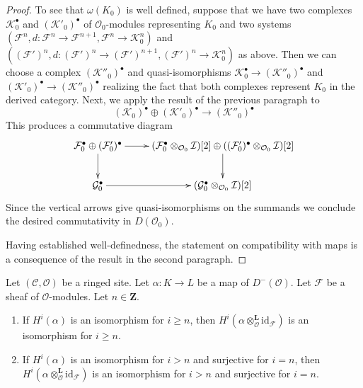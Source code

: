 \begin{proof}
\medskip\noindent
To see that $\omega(K_0)$ is well defined, suppose that we have two complexes
$\mathcal{K}_0^\bullet$ and $(\mathcal{K}'_0)^\bullet$
of $\mathcal{O}_0$-modules representing $K_0$ and two systems
$(\mathcal{F}^n, d : \mathcal{F}^n \to \mathcal{F}^{n + 1},
\mathcal{F}^n \to \mathcal{K}_0^n)$
and
$((\mathcal{F}')^n, d : (\mathcal{F}')^n \to (\mathcal{F}')^{n + 1},
(\mathcal{F}')^n \to \mathcal{K}_0^n)$
as above. Then we can choose a complex $(\mathcal{K}''_0)^\bullet$
and quasi-isomorphisms
$\mathcal{K}_0^\bullet  \to (\mathcal{K}''_0)^\bullet$
and
$(\mathcal{K}'_0)^\bullet  \to (\mathcal{K}''_0)^\bullet$
realizing the fact that both complexes represent $K_0$ in the
derived category. Next, we apply the result of the previous paragraph
to
$$
(\mathcal{K}_0)^\bullet \oplus (\mathcal{K}'_0)^\bullet
\longrightarrow
(\mathcal{K}''_0)^\bullet
$$
This produces a commutative diagram
$$
\xymatrix{
\mathcal{F}_0^\bullet \oplus (\mathcal{F}'_0)^\bullet
\ar[d] \ar[r] &
(\mathcal{F}_0^\bullet \otimes_{\mathcal{O}_0} \mathcal{I})[2] \oplus
((\mathcal{F}'_0)^\bullet \otimes_{\mathcal{O}_0} \mathcal{I})[2] \ar[d] \\
\mathcal{G}_0^\bullet \ar[r] &
(\mathcal{G}_0^\bullet \otimes_{\mathcal{O}_0} \mathcal{I})[2]
}
$$
Since the vertical arrows give quasi-isomorphisms on the summands
we conclude the desired commutativity in $D(\mathcal{O}_0)$.

\medskip\noindent
Having established well-definedness, the statement on compatibility
with maps is a consequence of the result in the second
paragraph.
\end{proof}

\begin{lemma}
\label{lemma-induced-map}
Let $(\mathcal{C}, \mathcal{O})$ be a ringed site.
Let $\alpha : K \to L$ be a map of $D^-(\mathcal{O})$.
Let $\mathcal{F}$ be a sheaf of $\mathcal{O}$-modules.
Let $n \in \mathbf{Z}$.
\begin{enumerate}
\item If $H^i(\alpha)$ is an isomorphism for $i \geq n$,
then $H^i(\alpha \otimes_\mathcal{O}^\mathbf{L} \text{id}_\mathcal{F})$
is an isomorphism for $i \geq n$.
\item If $H^i(\alpha)$ is an isomorphism for $i > n$ 
and surjective for $i = n$,
then $H^i(\alpha \otimes_\mathcal{O}^\mathbf{L} \text{id}_\mathcal{F})$
is an isomorphism for $i > n$ and surjective for $i = n$.
\end{enumerate}
\end{lemma}

